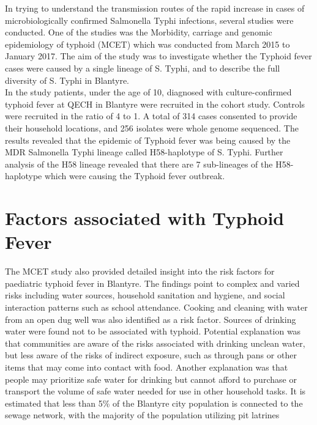 \documentclass[a4paper]{thesis}
\begin{document}
In trying to understand the transmission routes of the rapid increase in cases of microbiologically confirmed Salmonella Typhi infections, several studies were conducted. One of the studies was the Morbidity, carriage and genomic epidemiology of typhoid (MCET) which was conducted from March 2015 to January 2017.\cite{Feasey} The aim of the study was to investigate whether the Typhoid fever cases were caused by a single lineage of S. Typhi, and to describe the full diversity of S. Typhi in Blantyre.\\

In the study patients, under the age of 10, diagnosed with culture-confirmed typhoid fever at QECH in Blantyre were recruited in the cohort study. Controls were recruited in the ratio of 4 to 1. A total of 314 cases consented to provide their household locations, and 256 isolates were whole genome sequenced. The results revealed that the epidemic of Typhoid fever was being caused by the MDR Salmonella Typhi lineage called H58-haplotype of S. Typhi.\cite{Gauld2019a} Further analysis of the H58 lineage revealed that there are 7 sub-lineages of the H58-haplotype which were causing the Typhoid fever outbreak.\cite{Wailan}

\section{Factors associated with Typhoid Fever}

The MCET study also provided detailed insight into the risk factors for paediatric typhoid fever in Blantyre. The findings point to complex and varied risks including water sources, household sanitation and hygiene, and social interaction patterns such as school attendance.\cite{Gauld2019b} Cooking and cleaning with water from an open dug well was also identified as a risk factor. Sources of drinking water were found not to be associated with typhoid. Potential explanation was that communities are aware of the risks associated with drinking unclean water, but less aware of the risks of indirect exposure, such as through pans or other items that may come into contact with food. Another explanation was that people may prioritize safe water for drinking but cannot afford to purchase or transport the volume of safe water needed for use in other household tasks. It is estimated that  less than 5\% of the Blantyre city population is connected to the sewage network, with the majority of the population utilizing pit latrines \cite{NSO}\\
\end{document}
